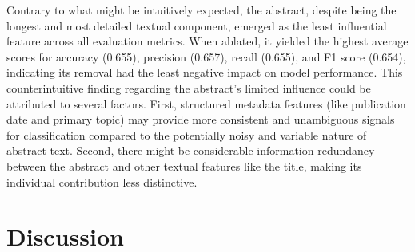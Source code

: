 \documentclass[pdflatex,sn-mathphys-num]{sn-jnl}%
\begin{document}
Contrary to what might be intuitively expected, the abstract, despite being the longest and most detailed textual component, emerged as the least influential feature across all evaluation metrics. When ablated, it yielded the highest average scores for accuracy (0.655), precision (0.657), recall (0.655), and F1 score (0.654), indicating its removal had the least negative impact on model performance. This counterintuitive finding regarding the abstract's limited influence could be attributed to several factors. First, structured metadata features (like publication date and primary topic) may provide more consistent and unambiguous signals for classification compared to the potentially noisy and variable nature of abstract text. Second, there might be considerable information redundancy between the abstract and other textual features like the title, making its individual contribution less distinctive. 


\section{Discussion}\label{sec:Discussion}




\end{document}
